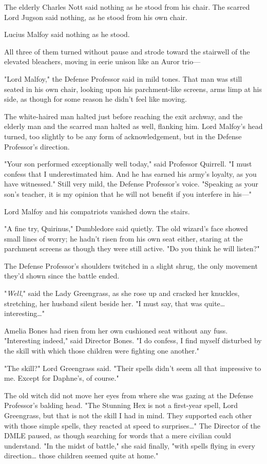 The elderly Charles Nott said nothing as he stood from his chair. The scarred 
Lord Jugson said nothing, as he stood from his own chair.

Lucius Malfoy said nothing as he stood.

All three of them turned without pause and strode toward the stairwell of the 
elevated bleachers, moving in eerie unison like an Auror trio---

"Lord Malfoy," the Defense Professor said in mild tones. That man was still 
seated in his own chair, looking upon his parchment-like screens, arms limp at 
his side, as though for some reason he didn't feel like moving.

The white-haired man halted just before reaching the exit archway, and the 
elderly man and the scarred man halted as well, flanking him. Lord Malfoy's 
head turned, too slightly to be any form of acknowledgement, but in the Defense 
Professor's direction.

"Your son performed exceptionally well today," said Professor Quirrell. "I must 
confess that I underestimated him. And he has earned his army's loyalty, as you 
have witnessed." Still very mild, the Defense Professor's voice. "Speaking as 
your son's teacher, it is my opinion that he will not benefit if you interfere 
in his---"

Lord Malfoy and his compatriots vanished down the stairs.

"A fine try, Quirinus," Dumbledore said quietly. The old wizard's face showed 
small lines of worry; he hadn't risen from his own seat either, staring at the 
parchment screens as though they were still active. "Do you think he will 
listen?"

The Defense Professor's shoulders twitched in a slight shrug, the only movement 
they'd shown since the battle ended.

"\emph{Well}," said the Lady Greengrass, as she rose up and cracked her 
knuckles, stretching, her husband silent beside her. "I must say, that was 
quite{\ldots} interesting{\ldots}"

Amelia Bones had risen from her own cushioned seat without any fuss. 
"Interesting indeed," said Director Bones. "I do confess, I find myself 
disturbed by the skill with which those children were fighting one another."

"The skill?" Lord Greengrass said. "Their spells didn't seem all that 
impressive to me. Except for Daphne's, of course."

The old witch did not move her eyes from where she was gazing at the Defense 
Professor's balding head. "The Stunning Hex is not a first-year spell, Lord 
Greengrass, but that is not the skill I had in mind. They supported each other 
with those simple spells, they reacted at speed to surprises{\ldots}" The 
Director of the DMLE paused, as though searching for words that a mere civilian 
could understand. "In the midst of battle," she said finally, "with spells 
flying in every direction{\ldots} those children seemed quite at home."

